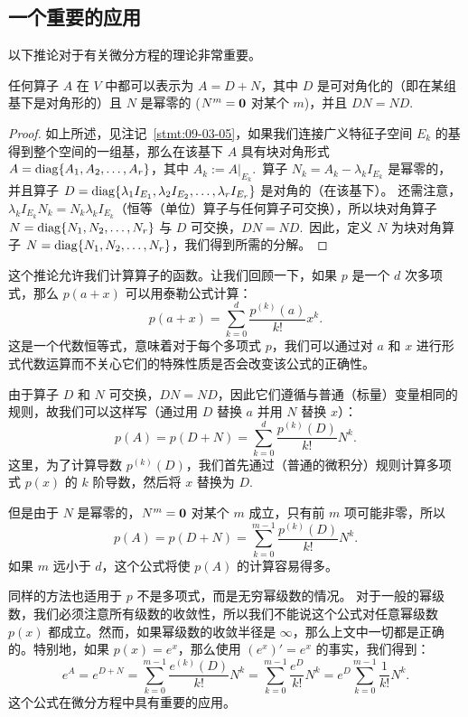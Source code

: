 \subsection{一个重要的应用}\label{sec:09-03-04}
以下推论对于有关微分方程的理论非常重要。

\begin{corollary}\label{stmt:09-03-09}
任何算子 $A$ 在 $V$ 中都可以表示为 $A = D + N$，其中 $D$ 是可对角化的（即在某组基下是对角形的）且 $N$ 是幂零的 ($N^m = \mathbf{0}$ 对某个 $m$)，并且 $DN = ND$.~
\end{corollary}

\begin{proof}如上所述，见注记~\ref{stmt:09-03-05}，如果我们连接广义特征子空间 $E_k$ 的基得到整个空间的一组基，那么在该基下 $A$ 具有块对角形式 $A = \operatorname{diag}\{A_1, A_2, \dots, A_r\}$，其中 $A_k := A|_{E_k}$.~算子 $N_k = A_k - \lambda_k I_{E_k}$ 是幂零的，并且算子 $D = \operatorname{diag}\{\lambda_1 I_{E_1}, \lambda_2 I_{E_2}, \dots, \lambda_r I_{E_r}\}$ 是对角的（在该基下）。
还需注意，$\lambda_k I_{E_k} N_k = N_k \lambda_k I_{E_k}$（恒等（单位）算子与任何算子可交换），所以块对角算子 $N = \operatorname{diag}\{N_1, N_2, \dots, N_r\}$ 与 $D$ 可交换，$DN = ND$.~因此，定义 $N$ 为块对角算子 $N = \operatorname{diag}\{N_1, N_2, \dots, N_r\}$，我们得到所需的分解。\end{proof}

这个推论允许我们计算算子的函数。让我们回顾一下，如果 $p$ 是一个 $d$ 次多项式，那么 $p(a + x)$ 可以用泰勒公式计算：
$$p(a + x) = \sum_{k=0}^d \frac{p^{(k)}(a)}{k!} x^k.$$
这是一个代数恒等式，意味着对于每个多项式 $p$，我们可以通过对 $a$ 和 $x$ 进行形式代数运算而不关心它们的特殊性质是否会改变该公式的正确性。

由于算子 $D$ 和 $N$ 可交换，$DN = ND$，因此它们遵循与普通（标量）变量相同的规则，故我们可以这样写（通过用 $D$ 替换 $a$ 并用 $N$ 替换 $x$）：
$$p(A) = p(D + N) = \sum_{k=0}^d \frac{p^{(k)}(D)}{k!} N^k.$$
这里，为了计算导数 $p^{(k)}(D)$，我们首先通过（普通的微积分）规则计算多项式 $p(x)$ 的 $k$ 阶导数，然后将 $x$ 替换为 $D$.~

但是由于 $N$ 是幂零的，$N^m = \mathbf{0}$ 对某个 $m$ 成立，只有前 $m$ 项可能非零，所以
$$p(A) = p(D + N) = \sum_{k=0}^{m-1} \frac{p^{(k)}(D)}{k!} N^k.$$
如果 $m$ 远小于 $d$，这个公式将使 $p(A)$ 的计算容易得多。

同样的方法也适用于 $p$ 不是多项式，而是无穷幂级数的情况。
对于一般的幂级数，我们必须注意所有级数的收敛性，所以我们不能说这个公式对任意幂级数 $p(x)$ 都成立。然而，如果幂级数的收敛半径是 $\infty$，那么上文中一切都是正确的。特别地，如果 $p(x) = e^x$，那么使用 $(e^x)' = e^x$ 的事实，我们得到：
$$e^A = e^{D + N} = \sum_{k=0}^{m-1} \frac{e^{(k)}(D)}{k!} N^k = \sum_{k=0}^{m-1} \frac{e^D}{k!} N^k = e^D \sum_{k=0}^{m-1} \frac{1}{k!} N^k.$$
这个公式在微分方程中具有重要的应用。

